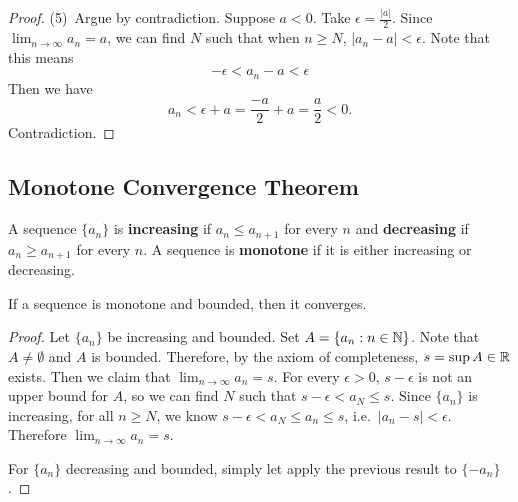 \begin{proof}
  (5)\, Argue by contradiction. Suppose $a < 0$. Take
  $\epsilon = \frac{|a|}{2}$. Since
  $\lim_{n \to \infty} a_n = a$, we can find $N$ such
  that when $n \ge N$, $|a_n - a| < \epsilon$. Note that
  this means
  \[-\epsilon < a_n - a < \epsilon \]
  Then we have
  \[a_n < \epsilon + a = \frac{-a}{2} + a = \frac{a}{2} < 0.\]
  Contradiction.
\end{proof}

\subsection{Monotone Convergence Theorem}

\begin{definition}
  A sequence $\{a_n\}$ is \textbf{increasing} if
  $a_n \le a_{n + 1}$ for every $n$ and \textbf{decreasing}
  if $a_n \ge a_{n + 1}$ for every $n$. A sequence is
  \textbf{monotone} if it is either increasing or decreasing.
\end{definition}

\begin{theorem}
  If a sequence is monotone and bounded, then it converges.
\end{theorem}

\begin{proof}
  Let $\{a_n\}$ be increasing and bounded. Set
  $A = \{a_n : n \in \mathbb{N}\}$.
  Note that $A \ne \emptyset$ and $A$ is bounded. Therefore, by the
  axiom of completeness, $s = \sup A \in \mathbb{R}$ exists.
  Then we claim that $\lim_{n \to \infty} a_n = s$.
  For
  every $\epsilon > 0$, $s - \epsilon$ is not an upper bound
  for $A$, so we can find $N$ such that
  $s - \epsilon < a_{N} \le s$. 
  Since $\{a_n\}$ is increasing, for all $n \ge N$, we know
  $s - \epsilon < a_N \le a_n \le s$,
  i.e.~$|a_n - s| < \epsilon$. Therefore
  $\lim_{n \to \infty} a_n = s$.

  For $\{a_n\}$ decreasing and bounded, simply let apply the
  previous result to $\{-a_n\}$.
\end{proof}
